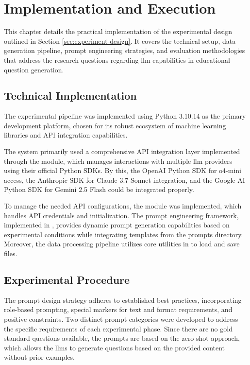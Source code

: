 \section{Implementation and Execution} 
\label{sec:implementation-and-execution}

This chapter details the practical implementation of the experimental design outlined in Section \ref{sec:experiment-design}. It covers the technical setup, data generation pipeline, prompt engineering strategies, and evaluation methodologies that address the research questions regarding \ac{llm} capabilities in educational question generation.

\subsection{Technical Implementation}

The experimental pipeline was implemented using Python 3.10.14 as the primary development platform, chosen for its robust ecosystem of machine learning libraries and API integration capabilities.

The system primarily used a comprehensive API integration layer implemented through the  module, which manages interactions with multiple \ac{llm} providers using their official Python SDKs. By this, the OpenAI Python SDK for o4-mini access, the Anthropic SDK for Claude 3.7 Sonnet integration, and the Google AI Python SDK for Gemini 2.5 Flash could be integrated properly. 

To manage the needed API configurations, the  module was implemented, which handles API credentials and initialization. The prompt engineering framework, implemented in , provides dynamic prompt generation capabilities based on experimental conditions while integrating templates from the prompts directory. Moreover, the data processing pipeline utilizes core utilities in  to load and save files.

\subsection{Experimental Procedure}

The prompt design strategy adheres to established best practices, incorporating role-based prompting, special markers for text and format requirements, and positive constraints. Two distinct prompt categories were developed to address the specific requirements of each experimental phase. Since there are no gold standard questions available, the prompts are based on the zero-shot approach, which allows the \ac{llms} to generate questions based on the provided content without prior examples.

